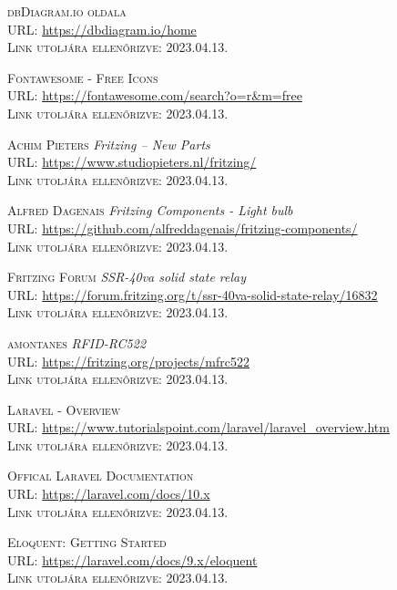 \documentclass[
]{thesis-ekf}
\theoremstyle{definition}
\theoremstyle{remark}
\begin{document}
\begin{thebibliography}{46}
		\textsc{dbDiagram.io oldala}\\
		\textsc{URL:} \url{https://dbdiagram.io/home}\\
		\textsc{Link utoljára ellenőrizve:} 2023.04.13.
		
		\textsc{Fontawesome - Free Icons}\\
		\textsc{URL:} \url{https://fontawesome.com/search?o=r&m=free}\\
		\textsc{Link utoljára ellenőrizve:} 2023.04.13.
		
		\textsc{Achim Pieters} \emph{Fritzing – New Parts}\\
		\textsc{URL:} \url{https://www.studiopieters.nl/fritzing/}\\
		\textsc{Link utoljára ellenőrizve:} 2023.04.13.
		
		\textsc{Alfred Dagenais} \emph{Fritzing Components - Light bulb}\\
		\textsc{URL:} \url{https://github.com/alfreddagenais/fritzing-components/}\\
		\textsc{Link utoljára ellenőrizve:} 2023.04.13.
		
		\textsc{Fritzing Forum} \emph{SSR-40va solid state relay}\\
		\textsc{URL:} \url{https://forum.fritzing.org/t/ssr-40va-solid-state-relay/16832}\\
		\textsc{Link utoljára ellenőrizve:} 2023.04.13.
		
		\textsc{amontanes} \emph{RFID-RC522}\\
		\textsc{URL:} \url{https://fritzing.org/projects/mfrc522}\\
		\textsc{Link utoljára ellenőrizve:} 2023.04.13.
		
		\textsc{Laravel - Overview}\\
		\textsc{URL:} \url{https://www.tutorialspoint.com/laravel/laravel_overview.htm}\\
		\textsc{Link utoljára ellenőrizve:} 2023.04.13.
		
		\textsc{Offical Laravel Documentation}\\
		\textsc{URL:} \url{https://laravel.com/docs/10.x}\\
		\textsc{Link utoljára ellenőrizve:} 2023.04.13.
		
		\textsc{Eloquent: Getting Started}\\
		\textsc{URL:} \url{https://laravel.com/docs/9.x/eloquent}\\
		\textsc{Link utoljára ellenőrizve:} 2023.04.13.
		

\end{thebibliography}
\end{document}
